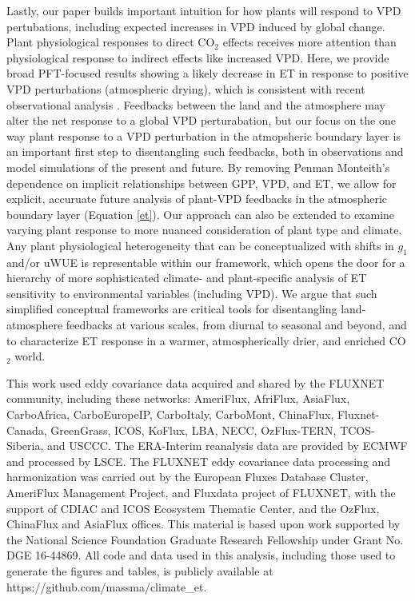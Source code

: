 \documentclass[draft,linenumbers]{agujournal}
\begin{document}
Lastly, our paper builds important intuition for how plants will respond to VPD pertubations, including expected increases in VPD induced by global change.  Plant physiological responses to direct CO$_2$ effects \citep[e.g.,][]{Swann_2016} receives more attention than physiological response to indirect effects like increased VPD. Here, we provide broad PFT-focused results showing a likely decrease in ET in response to positive VPD perturbations (atmospheric drying), which is consistent with recent observational analysis \citep[e.g.,][]{Rigden_2017}. Feedbacks between the land and the atmosphere may alter the net response to a global VPD perturabation, but our focus on the one way plant response to a VPD perturbation in the atmopsheric boundary layer is an important first step to disentangling such feedbacks, both in observations and model simulations of the present and future. By removing Penman Monteith's dependence on implicit relationships between GPP, VPD, and ET, we allow for explicit, accuruate future analysis of plant-VPD feedbacks in the atmospheric boundary layer (Equation \ref{et}). Our approach can also be extended to examine varying plant response to more nuanced consideration of plant type and climate. Any plant physiological heterogeneity that can be conceptualized with shifts in $g_1$ \citep[e.g.][]{Lin_2015, Medlyn_2017} and/or uWUE \citep[e.g.][]{Zhou_2014} is representable within our framework, which opens the door for a hierarchy of more sophisticated climate- and plant-specific analysis of ET sensitivity to environmental variables (including VPD). We argue that such simplified conceptual frameworks are critical tools for disentangling land-atmosphere feedbacks at various scales, from diurnal to seasonal and beyond, and to characterize ET response in a warmer, atmospherically drier, and enriched CO$_2$ world. 


\acknowledgments
This work used eddy covariance data acquired and shared by the FLUXNET community, including these networks: AmeriFlux, AfriFlux, AsiaFlux, CarboAfrica, CarboEuropeIP, CarboItaly, CarboMont, ChinaFlux, Fluxnet-Canada, GreenGrass, ICOS, KoFlux, LBA, NECC, OzFlux-TERN, TCOS-Siberia, and USCCC. The ERA-Interim reanalysis data are provided by ECMWF and processed by LSCE. The FLUXNET eddy covariance data processing and harmonization was carried out by the European Fluxes Database Cluster, AmeriFlux Management Project, and Fluxdata project of FLUXNET, with the support of CDIAC and ICOS Ecosystem Thematic Center, and the OzFlux, ChinaFlux and AsiaFlux offices. This material is based upon work supported by the National Science Foundation Graduate Research Fellowship under Grant No. DGE 16-44869. All code and data used in this analysis, including those used to generate the figures and tables, is publicly available at https://github.com/massma/climate\_et.



\end{document}
